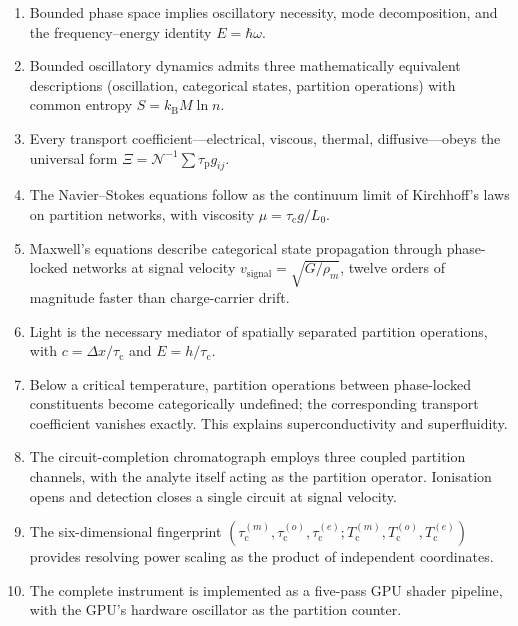 \documentclass[twocolumn,10pt,a4paper]{article}
\theoremstyle{definition}
\theoremstyle{remark}
\newcommand{\kB}{k_{\mathrm{B}}}
\newcommand{\tauP}{\tau_{\mathrm{p}}}
\newcommand{\tauC}{\tau_{\mathrm{c}}}
\newcommand{\tauM}{\tau_{\mathrm{c}}^{(m)}}
\newcommand{\tauO}{\tau_{\mathrm{c}}^{(o)}}
\newcommand{\tauE}{\tau_{\mathrm{c}}^{(e)}}
\newcommand{\TcM}{T_{\mathrm{c}}^{(m)}}
\newcommand{\TcO}{T_{\mathrm{c}}^{(o)}}
\newcommand{\TcE}{T_{\mathrm{c}}^{(e)}}
\newcommand{\Norm}{\mathcal{N}}
\newcommand{\Transp}{\Xi}
\begin{document}
\begin{enumerate}[leftmargin=1.5em]
\item Bounded phase space implies oscillatory necessity, mode decomposition, and the frequency--energy identity $E = \hbar\omega$.

\item Bounded oscillatory dynamics admits three mathematically equivalent descriptions (oscillation, categorical states, partition operations) with common entropy $S = \kB M \ln n$.

\item Every transport coefficient---electrical, viscous, thermal, diffusive---obeys the universal form $\Transp = \Norm^{-1}\sum \tauP g_{ij}$.

\item The Navier--Stokes equations follow as the continuum limit of Kirchhoff's laws on partition networks, with viscosity $\mu = \tauC g / L_0$.

\item Maxwell's equations describe categorical state propagation through phase-locked networks at signal velocity $v_{\mathrm{signal}} = \sqrt{G/\rho_m}$, twelve orders of magnitude faster than charge-carrier drift.

\item Light is the necessary mediator of spatially separated partition operations, with $c = \Delta x/\tauC$ and $E = h/\tauC$.

\item Below a critical temperature, partition operations between phase-locked constituents become categorically undefined; the corresponding transport coefficient vanishes exactly. This explains superconductivity and superfluidity.

\item The circuit-completion chromatograph employs three coupled partition channels, with the analyte itself acting as the partition operator. Ionisation opens and detection closes a single circuit at signal velocity.

\item The six-dimensional fingerprint $(\tauM, \tauO, \tauE; \TcM, \TcO, \TcE)$ provides resolving power scaling as the product of independent coordinates.

\item The complete instrument is implemented as a five-pass GPU shader pipeline, with the GPU's hardware oscillator as the partition counter.
\end{enumerate}
\end{document}
